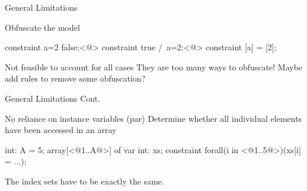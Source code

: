 \documentclass[aspectratio=169]{beamer} %
\begin{document}
\begin{frame}[fragile]{General Limitations}
  \begin{block}{Obfuscate the model}
    \begin{mznno}
constraint a=2 \/ false;<@\pause@> %
constraint true /\ a=2;<@\pause@>
constraint [a] = [2];
    \end{mznno}
  \end{block}

  \pause
  \begin{alertblock}{Not feasible to account for all cases}
    They are too many ways to obfuscate!
    Maybe add rules to remove some obfuscation?
  \end{alertblock}
\end{frame}

\begin{frame}[fragile]{General Limitations Cont.}
  \begin{block}{No reliance on instance variables (par)}
    \pause
    Determine whether all individual elements have been accessed in an array\pause
    \begin{mznno}
int: A = 5;
array[<@\alert{1..A}@>] of var int: xs;
constraint forall(i in <@\alert{1..5}@>)(xs[i] = ...);
    \end{mznno} %
    \pause The index sets have to be exactly the same.
  \end{block}
\end{frame}
\end{document}
